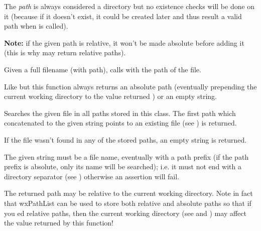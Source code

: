 The {\it path} is always considered a directory but no existence checks will be done on it
(because if it doesn't exist, it could be created later and thus result a valid path when
 is called).

{\bf Note:} if the given path is relative, it won't be made absolute before adding it
(this is why  may return relative paths).


\label{wxpathlistensurefileaccessible}


Given a full filename (with path), calls  with the path
of the file.


\label{wxpathlistfindabsolutepath}


Like  but this function always
returns an absolute path (eventually prepending the current working directory
to the value returned ) or an
empty string.


\label{wxpathlistfindvalidpath}


Searches the given file in all paths stored in this class.
The first path which concatenated to the given string points to an existing
file (see ) is returned.

If the file wasn't found in any of the stored paths, an empty string is returned.

The given string must be a file name, eventually with a path prefix (if the path
prefix is absolute, only its name will be searched); i.e. it must not end with
a directory separator (see )
otherwise an assertion will fail.

The returned path may be relative to the current working directory.
Note in fact that wxPathList can be used to store both relative and absolute paths so that
if you ed relative paths, then the current working directory
(see  and )
may affect the value returned by this function!

